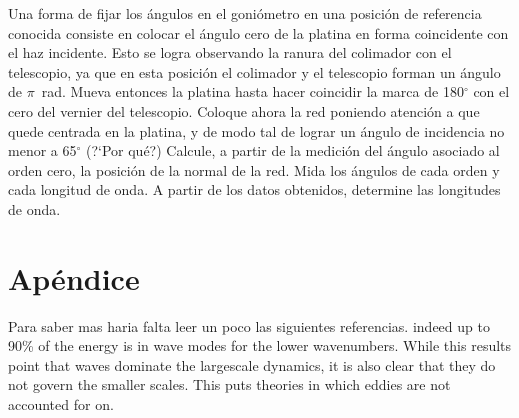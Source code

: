 \documentclass[epj]{svjour}
\begin{document}
Una forma de fijar los \'angulos en el goni\'ometro en una posici\'on de 
referencia conocida consiste en colocar el \'angulo cero de la platina en 
forma coincidente con el haz incidente. Esto se logra observando la ranura
del colimador con el telescopio, ya que en esta posici\'on el colimador
y el telescopio forman un \'angulo de $\pi$~rad. Mueva entonces la platina
hasta hacer coincidir la marca de 180$^\circ$ con el cero del vernier del
telescopio. Coloque ahora la red poniendo atenci\'on a que quede centrada en
la platina, y de modo tal de lograr un \'angulo de incidencia no menor a 
65$^\circ$ (?`Por qu\'e?) Calcule, a partir de la medici\'on del \'angulo 
asociado al orden cero, la posici\'on de la normal de la red. Mida los 
\'angulos de cada orden y cada longitud de onda. A partir de los datos 
obtenidos, determine las longitudes de onda. 







\section*{Ap\'endice}








        
\begin{sabermas}
Para saber mas haria falta leer un poco las siguientes referencias.
indeed up to 90\% of the energy is in wave modes for the lower
wavenumbers. While this results point that waves dominate the largescale
dynamics, it is also clear that they do not govern the smaller scales.
This puts theories in which eddies are not accounted for on.
\end{sabermas}

% 
% 
\end{document}
